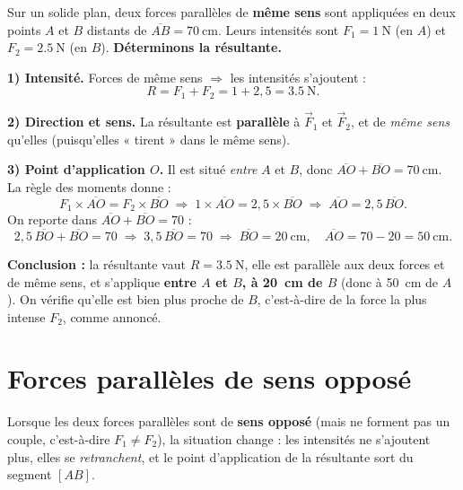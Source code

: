 \documentclass[11pt,a4paper]{article}
\newcommand{\vv}[1]{\vec{#1}}
\begin{document}
\begin{exemple}
Sur un solide plan, deux forces parallèles de \textbf{même sens} sont appliquées en deux points $A$
et $B$ distants de $\overline{AB}=\SI{70}{\centi\metre}$. Leurs intensités sont $F_1 = \SI{1}{\newton}$
(en $A$) et $F_2 = \SI{2.5}{\newton}$ (en $B$). \textbf{Déterminons la résultante.}

\smallskip
\textbf{1) Intensité.} Forces de même sens $\Rightarrow$ les intensités s'ajoutent :
\[
R = F_1 + F_2 = 1 + 2{,}5 = \SI{3.5}{\newton}.
\]

\textbf{2) Direction et sens.} La résultante est \textbf{parallèle} à $\vv F_1$ et $\vv F_2$, et de
\emph{même sens} qu'elles (puisqu'elles « tirent » dans le même sens).

\textbf{3) Point d'application $O$.} Il est situé \emph{entre} $A$ et $B$, donc $\overline{AO}+\overline{BO}=\SI{70}{\centi\metre}$.
La règle des moments donne :
\[
F_1\times\overline{AO} = F_2\times\overline{BO}
\;\Longrightarrow\; 1\times\overline{AO} = 2{,}5\times\overline{BO}
\;\Longrightarrow\; \overline{AO} = 2{,}5\,\overline{BO}.
\]
On reporte dans $\overline{AO}+\overline{BO}=70$ :
\[
2{,}5\,\overline{BO} + \overline{BO} = 70
\;\Longrightarrow\; 3{,}5\,\overline{BO} = 70
\;\Longrightarrow\; \overline{BO} = \SI{20}{\centi\metre},
\quad \overline{AO} = 70-20 = \SI{50}{\centi\metre}.
\]

\textbf{Conclusion :} la résultante vaut $R=\SI{3.5}{\newton}$, elle est parallèle aux deux forces et de
même sens, et s'applique \textbf{entre $A$ et $B$, à \SI{20}{\centi\metre} de $B$} (donc à
\SI{50}{\centi\metre} de $A$). On vérifie qu'elle est bien plus proche de $B$, c'est-à-dire de la
force la plus intense $F_2$, comme annoncé.
\end{exemple}

\section{Forces parallèles de sens opposé}
Lorsque les deux forces parallèles sont de \textbf{sens opposé} (mais ne forment pas un couple,
c'est-à-dire $F_1 \neq F_2$), la situation change : les intensités ne s'ajoutent plus, elles se
\emph{retranchent}, et le point d'application de la résultante sort du segment $[AB]$.
\end{document}
